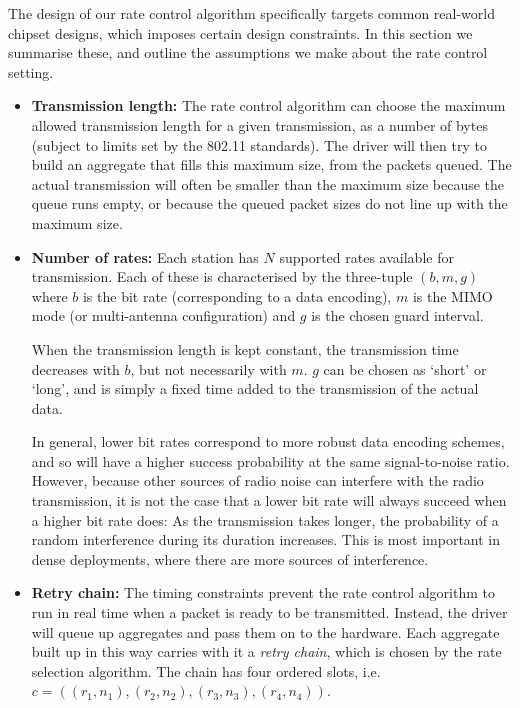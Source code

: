 \documentclass{sig-alternate}
\begin{document}
        The design of our rate control algorithm specifically targets common
        real-world chipset designs, which imposes certain design constraints. In
        this section we summarise these, and outline the assumptions we make
        about the rate control setting.

        \begin{itemize}
        \item \textbf{Transmission length:} The rate control algorithm can
          choose the maximum allowed transmission length for a given
          transmission, as a number of bytes (subject to limits set by the
          802.11 standards). The driver will then try to build an aggregate that
          fills this maximum size, from the packets queued. The actual
          transmission will often be smaller than the maximum size because the
          queue runs empty, or because the queued packet sizes do not line up
          with the maximum size.

        \item \textbf{Number of rates:} Each station has $N$ supported rates
          available for transmission. Each of these is characterised by the
          three-tuple $(b,m,g)$ where $b$ is the bit rate (corresponding to a
          data encoding), $m$ is the MIMO mode (or multi-antenna configuration)
          and $g$ is the chosen guard interval.

          When the transmission length is kept constant, the transmission time
          decreases with $b$, but not necessarily with $m$. $g$ can be chosen as
          `short' or `long', and is simply a fixed time added to the
          transmission of the actual data.

          In general, lower bit rates correspond to more robust data encoding
          schemes, and so will have a higher success probability at the same
          signal-to-noise ratio. However, because other sources of radio
          noise can interfere with the radio transmission, it is not the case
          that a lower bit rate will always succeed when a higher bit rate does:
          As the transmission takes longer, the probability of a random
          interference during its duration increases. This is most important in
          dense deployments, where there are more sources of interference.

        \item \textbf{Retry chain:} The timing constraints prevent the rate
          control algorithm to run in real time when a packet is ready to be
          transmitted. Instead, the driver will queue up aggregates and pass
          them on to the hardware. Each aggregate built up in this way carries
          with it a \emph{retry chain}, which is chosen by the rate selection
          algorithm. The chain has four ordered slots, i.e.
          $c=((r_1,n_1),(r_2,n_2),(r_3,n_3),(r_4,n_4))$.


\end{itemize}
\end{document}
